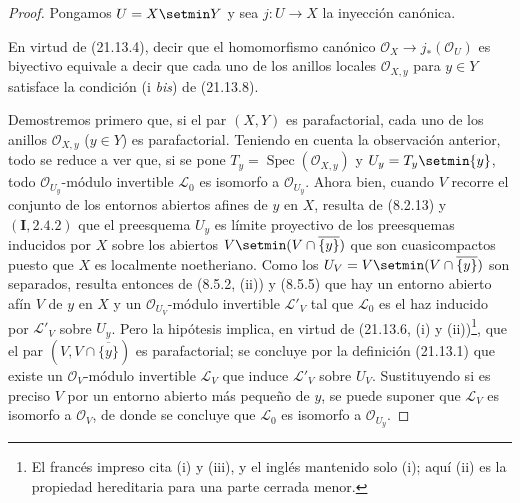 \begin{proof}
Pongamos $U=X\setmin Y$ y sea $j:U\to X$ la inyección canónica.

En virtud de (21.13.4), decir que el homomorfismo canónico
$\mathcal O_X\to j_*(\mathcal O_U)$ es biyectivo equivale a decir que cada uno de los
anillos locales $\mathcal O_{X,y}$ para $y\in Y$ satisface la condición (i \emph{bis}) de
(21.13.8).

Demostremos primero que, si el par $(X,Y)$ es parafactorial, cada uno de los anillos
$\mathcal O_{X,y}$ ($y\in Y$) es parafactorial. Teniendo en cuenta la observación
anterior, todo se reduce a ver que, si se pone
$T_y=\operatorname{Spec}(\mathcal O_{X,y})$ y $U_y=T_y\setmin\{y\}$, todo
$\mathcal O_{U_y}$-módulo invertible $\mathscr L_0$ es isomorfo a
$\mathcal O_{U_y}$. Ahora bien, cuando $V$ recorre el conjunto de los entornos abiertos
afines de $y$ en $X$, resulta de (8.2.13) y $(\mathbf I, 2.4.2)$ que el
preesquema $U_y$ es límite proyectivo de los preesquemas inducidos por $X$ sobre los abiertos
$V\setmin(V\cap\overline{\{y\}})$ que son cuasicompactos puesto que $X$ es localmente
noetheriano. Como los $U_V=V\setmin(V\cap\overline{\{y\}})$ son separados, resulta entonces de
(8.5.2, (ii)) y (8.5.5) que hay un entorno abierto afín $V$ de $y$ en $X$ y
un $\mathcal O_{U_V}$-módulo invertible $\mathscr L'_V$ tal que $\mathscr L_0$ es el
haz inducido por $\mathscr L'_V$ sobre $U_y$. Pero la hipótesis implica, en virtud de
(21.13.6, (i) y (ii))\footnote{El francés impreso cita (i) y (iii), y el inglés mantenido solo (i); aquí (ii) es la propiedad
hereditaria para una parte cerrada menor.}, que el par $(V,V\cap\overline{\{y\}})$ es parafactorial;
se concluye por la definición (21.13.1) que existe un $\mathcal O_V$-módulo invertible
$\mathscr L_V$ que induce $\mathscr L'_V$ sobre $U_V$. Sustituyendo si es preciso $V$ por un
entorno abierto más pequeño de $y$, se puede suponer que $\mathscr L_V$ es isomorfo
a $\mathcal O_V$, de donde se concluye que $\mathscr L_0$ es isomorfo a
$\mathcal O_{U_y}$.


\end{proof}
